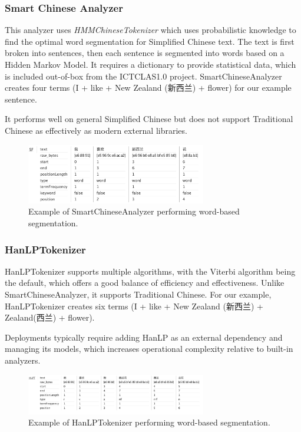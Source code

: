 \documentclass[11pt]{article}
\begin{document}
\subsubsection{Smart Chinese Analyzer}
This analyzer uses \textit{HMMChineseTokenizer} which uses probabilistic knowledge to find the optimal word segmentation for Simplified Chinese text. The text is first broken into sentences, then each sentence is segmented into words based on a Hidden Markov Model. It requires a dictionary to provide statistical data, which is included out-of-box from the ICTCLAS1.0 project. SmartChineseAnalyzer creates four terms (I + like + New Zealand (新西兰) + flower) for our example sentence.

It performs well on general Simplified Chinese but does not support Traditional Chinese as effectively as modern external libraries.

\begin{figure}[h!]
    \centering
    \includegraphics[width=0.7\textwidth]{image3.png}
    \caption{Example of SmartChineseAnalyzer performing word-based segmentation.}
    \label{fig:smart_chinese_analyzer}
\end{figure}

\subsubsection{HanLPTokenizer}
HanLPTokenizer supports multiple algorithms, with the Viterbi algorithm being the default, which offers a good balance of efficiency and effectiveness. Unlike SmartChineseAnalyzer, it supports Traditional Chinese. For our example, HanLPTokenizer creates six terms (I + like + New Zealand (新西兰) + Zealand(西兰) + flower).

Deployments typically require adding HanLP as an external dependency and managing its models, which increases operational complexity relative to built-in analyzers.

\begin{figure}[h!]
    \centering
    \includegraphics[width=0.7\textwidth]{image4.png}
    \caption{Example of HanLPTokenizer performing word-based segmentation.}
    \label{fig:hanlp_tokenizer}
\end{figure}
\end{document}
